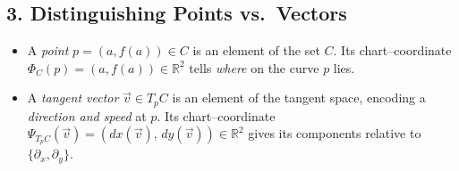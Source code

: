 \documentclass[12pt]{article}
\begin{document}
	\subsection*{3. Distinguishing Points vs.\ Vectors}
	\begin{itemize}
		\item A \emph{point} \(p=(a,f(a))\in C\) is an element of the set \(C\).  Its chart–coordinate
		\(\Phi_C(p)=(a,f(a))\in\mathbb{R}^2\) tells \emph{where} on the curve \(p\) lies.
		\item A \emph{tangent vector} \(\vec v\in T_pC\) is an element of the tangent space,
		encoding a \emph{direction and speed} at \(p\).  Its chart–coordinate
		\(\Psi_{T_pC}(\vec v)=(dx(\vec v),\,dy(\vec v))\in\mathbb{R}^2\) gives its
		components relative to \(\{\partial_x,\partial_y\}\).
	\end{itemize}
	
\end{document}
